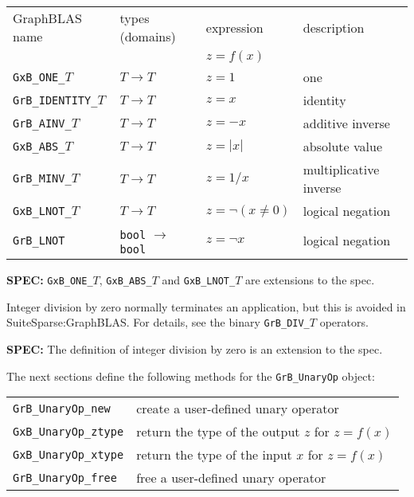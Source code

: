 \documentclass[12pt]{article}
\begin{document}
\vspace{0.2in}
{\footnotesize
\begin{tabular}{llll}
\hline
GraphBLAS name          & types (domains)   & expression    & description \\
                        &                   & $z=f(x)$      & \\
\hline
\verb'GxB_ONE_'$T$      & $T \rightarrow T$ & $z = 1$       & one \\
\verb'GrB_IDENTITY_'$T$ & $T \rightarrow T$ & $z = x$       & identity \\
\verb'GrB_AINV_'$T$     & $T \rightarrow T$ & $z = -x$      & additive inverse \\
\verb'GxB_ABS_'$T$      & $T \rightarrow T$ & $z = |x|$     & absolute value \\
\verb'GrB_MINV_'$T$     & $T \rightarrow T$ & $z = 1/x$     & multiplicative inverse \\
\verb'GxB_LNOT_'$T$     & $T \rightarrow T$ & $z = \lnot (x \ne 0)$ & logical negation \\
\hline
\verb'GrB_LNOT'         & \verb'bool'
                          $\rightarrow$
                          \verb'bool'       & $z = \lnot x$ & logical negation \\
\hline
\end{tabular}
}
\vspace{0.2in}

\begin{spec}
{\bf SPEC:} \verb'GxB_ONE_'$T$, \verb'GxB_ABS_'$T$ and \verb'GxB_LNOT_'$T$ are extensions to the spec.
\end{spec}

Integer division by zero normally terminates an application, but this is
avoided in SuiteSparse:GraphBLAS.  For details, see the binary
\verb'GrB_DIV_'$T$ operators.

\begin{spec}
{\bf SPEC:} The definition of integer division by zero is an extension to the spec.
\end{spec}

The next sections define the following methods for the \verb'GrB_UnaryOp'
object:

\vspace{0.1in}
{\footnotesize
\begin{tabular}{ll}
\hline
\verb'GrB_UnaryOp_new'   & create a user-defined unary operator  \\
\verb'GxB_UnaryOp_ztype' & return the type of the output $z$ for $z=f(x)$\\
\verb'GxB_UnaryOp_xtype' & return the type of the input $x$ for $z=f(x)$\\
\verb'GrB_UnaryOp_free'  & free a user-defined unary operator  \\
\hline
\end{tabular}
}
\vspace{0.1in}
\end{document}
